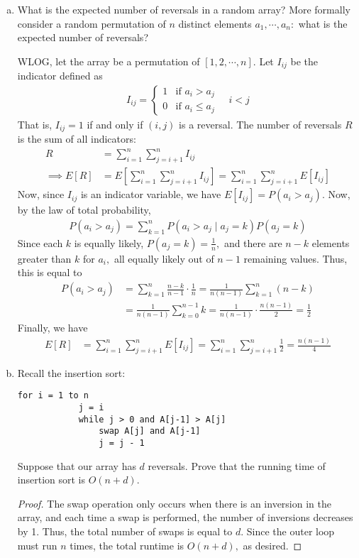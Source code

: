 \documentclass{article}
\begin{document}
\begin{enumerate}[(a)]
	\item What is the expected number of reversals in a random array? More formally consider a random permutation of $n$ distinct elements $a_1, \cdots, a_n:$ what is the expected number of reversals?
		\begin{soln}
			WLOG, let the array be a permutation of $[1, 2, \cdots, n].$ Let $I_{ij}$ be the indicator defined as
			\begin{align*}
				I_{ij} = \begin{cases}
					1 & \text{if } a_i>a_j \\
					0 & \text{if } a_i\le a_j
				\end{cases}\quad i<j
			\end{align*}
			That is, $I_{ij}=1$ if and only if $(i, j)$ is a reversal. The number of reversals $R$ is the sum of all indicators:
			\begin{align*}
				R &= \sum_{i=1}^{n} \sum_{j=i+1}^{n} I_{ij} \\
				\implies E[R] &= E\left[ \sum_{i=1}^{n} \sum_{j=i+1}^{n} I_{ij} \right] = \sum_{i=1}^{n} \sum_{j=i+1}^{n} E[I_{ij}]
			\end{align*}
			Now, since $I_{ij}$ is an indicator variable, we have $E[I_{ij}] = P(a_i>a_j).$ Now, by the law of total probability, 
			\begin{align*}
				P(a_i>a_j) = \sum_{k=1}^{n} P(a_i>a_j\mid a_j=k)P(a_j=k)
			\end{align*}
			Since each $k$ is equally likely, $P(a_j=k)=\frac{1}{n},$ and there are $n-k$ elements greater than $k$ for $a_i,$ all equally likely out of $n-1$ remaining values. Thus, this is equal to
			\begin{align*}
				P(a_i>a_j) &= \sum_{k=1}^{n} \frac{n-k}{n-1} \cdot \frac{1}{n} = \frac{1}{n(n-1)} \sum_{k=1}^{n} (n-k) \\
				&= \frac{1}{n(n-1)}\sum_{k=0}^{n-1} k = \frac{1}{n(n-1)} \cdot \frac{n(n-1)}{2} = \frac{1}{2}
			\end{align*}
			Finally, we have
			\begin{align*}
				E[R] &= \sum_{i=1}^{n} \sum_{j=i+1}^{n} E[I_{ij}] = \sum_{i=1}^{n} \sum_{j=i+1}^{n} \frac{1}{2} = \frac{n(n-1)}{4}
			\end{align*}
		\end{soln}

	\item Recall the insertion sort:		
		\begin{Verbatim}[tabsize=4]
		for i = 1 to n
			j = i
			while j > 0 and A[j-1] > A[j]
				swap A[j] and A[j-1]
				j = j - 1
		\end{Verbatim}
		Suppose that our array has $d$ reversals. Prove that the running time of insertion sort is $O(n+d).$
		\begin{proof}
			The swap operation only occurs when there is an inversion in the array, and each time a swap is performed, the number of inversions decreases by 1. Thus, the total number of swaps is equal to $d.$ Since the outer loop must run $n$ times, the total runtime is $O(n+d),$ as desired.
		\end{proof}


\end{enumerate}
\end{document}

